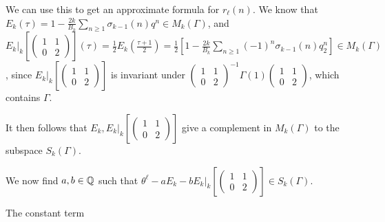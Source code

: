 \documentclass[10pt,a4paper]{article}
\begin{document}
We can use this to get an approximate formula for $r_\ell(n)$. We know that $E_k(\tau) = 1 - \frac{2k}{B_k}\sum_{n \geq 1}\sigma_{k-1}(n)q^n \in M_k(\Gamma)$, and $E_k|_k[\begin{pmatrix}1&1\\0&2\end{pmatrix}](\tau) = \frac{1}{2}E_k(\frac{\tau+1}{2}) = \frac{1}{2}[1-\frac{2k}{B_k}\sum_{n\geq 1}(-1)^n \sigma_{k-1}(n)q_2^n] \in M_k(\Gamma)$, since $E_k|_k[\begin{pmatrix}1&1\\0&2\end{pmatrix}]$ is invariant under $\begin{pmatrix}1&1\\0&2\end{pmatrix}^{-1}\Gamma(1)\begin{pmatrix}1&1\\0&2 \end{pmatrix}$, which contains $\Gamma$.

It then follows that $E_k, E_k|_k[\begin{pmatrix}1&1\\0&2\end{pmatrix}]$ give a complement in $M_k(\Gamma)$ to the subspace $S_k(\Gamma)$.

We now find $a, b \in \mathbb{Q}$ such that $\theta^\ell - aE_k -bE_k|_k[\begin{pmatrix}1&1\\0&2\end{pmatrix}] \in S_k(\Gamma)$.

The constant term
\end{document}
